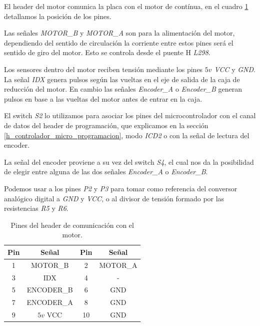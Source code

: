 El header del motor comunica la placa con el motor de cont\'inua, en el cuadro \ref{hT_placa_dc_header_motor}
detallamos la posici\'on de los pines.

Las se\~nales \emph{MOTOR\_B} y \emph{MOTOR\_A} son para la alimentaci\'on del motor, dependiendo del sentido
de circulaci\'on la corriente entre estos pines ser\'a el sentido de giro del motor.
Esto se controla desde el puente H \emph{L298}.

Los sensores dentro del motor  reciben tensi\'on mediante los pines \emph{$5v$ VCC} y \emph{GND}.
La se\~nal \emph{IDX} genera pulsos seg\'un las vueltas en el eje de salida de la caja de reducci\'on del
motor.
En cambio las se\~nales \emph{Encoder\_A} o \emph{Encoder\_B} generan pulsos en base a las vueltas del motor
antes de entrar en la caja.

El switch \emph{S2} lo utilizamos para asociar los pines del microcontrolador con el canal de datos del header
de programaci\'on, que explicamos en la secci\'on \ref{h_controlador_micro_programacion}, modo \emph{ICD2} o
con la se\~nal de lectura del encoder.

La se\~nal del encoder proviene a su vez del switch \emph{S4}, el cual nos da la posibilidad de elegir entre
alguna de las dos se\~nales \emph{Encoder\_A} o \emph{Encoder\_B}.

Podemos usar a los pines \emph{P2} y \emph{P3} para tomar como referencia del conversor anal\'ogico digital
a \emph{GND} y \emph{VCC}, o al divisor de tensi\'on formado por las resistencias \emph{R5} y \emph{R6}.

\begin{table}
	\begin{center}
		\begin{tabular}{|c|c|c|c|}
			\hline
			Pin & Se\~nal & Pin & Se\~nal \\
			\hline
			1 & MOTOR\_B & 2 & MOTOR\_A \\
			\hline
			3 & IDX & 4 & - \\
			\hline
			5 & ENCODER\_B & 6 & GND \\
			\hline
			7 & ENCODER\_A & 8 & GND \\
			\hline
			9 & $5v$ VCC & 10 & GND \\
			\hline
		\end{tabular}
		\caption{Pines del header de comunicaci\'on con el motor.}
		\label{hT_placa_dc_header_motor}
	\end{center}
\end{table}

